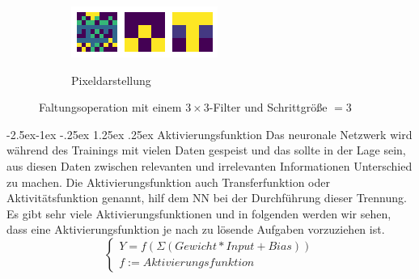 \documentclass[12pt,a4paper]{scrartcl}
\makeatletter
\numberwithin{equation}{section}
\renewcommand\paragraph{\@startsection{paragraph}{4}{\z@}%
	{-2.5ex\@plus -1ex \@minus -.25ex}%
	{1.25ex \@plus .25ex}%
	{\normalfont\normalsize\bfseries}}
\makeatother
\begin{document}
\begin{figure}[h]
\begin{subfigure}{\textwidth}
		\label{fig:Faltungsoperation1}
	\end{subfigure}
	\begin{subfigure}{\textwidth}
		\centering
		\caption{ Pixeldarstellung }
		\includegraphics[width=\textwidth]{activation}
		\label{fig:Faltungsoperation2}
	\end{subfigure}
	
	\caption{Faltungsoperation mit einem $ 3\times 3$-Filter und Schrittgröße $ =3 $}
	\label{fig:Faltungsoperation}
\end{figure}

\paragraph{Aktivierungsfunktion}\label{Aktivierungsfunktion}
Das neuronale Netzwerk wird während des Trainings mit vielen Daten gespeist und das sollte in der Lage sein, aus diesen Daten zwischen relevanten und irrelevanten Informationen Unterschied zu machen.
Die Aktivierungsfunktion auch Transferfunktion oder Aktivitätsfunktion genannt, hilf dem \ac{NN} bei der Durchführung dieser Trennung. Es gibt sehr viele Aktivierungsfunktionen und in folgenden werden wir sehen, dass eine Aktivierungsfunktion je nach zu lösende Aufgaben  vorzuziehen ist.\[\begin{cases}
Y = f(\Sigma (Gewicht*Input + Bias))\\ f:= Aktivierungsfunktion
\end{cases} \]
\end{document}
